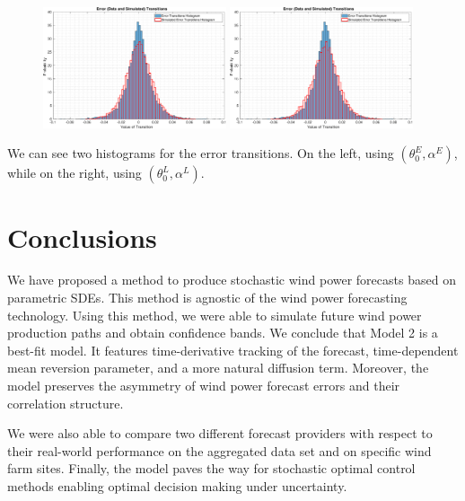 \documentclass[11pt]{article}
\theoremstyle{definition}
\begin{document}
\begin{figure}[ht!]
\centering
\includegraphics[width=0.48\textwidth]{../../MATLAB_Files/Results/histograms/classic/Optimal.eps}
\includegraphics[width=0.48\textwidth]{../../MATLAB_Files/Results/histograms/classic/Lamperti_Optimal.eps}
\end{figure}

We can see two histograms for the error transitions. On the left, using $(\theta_0^E,\alpha^E)$, while on the right, using $(\theta_0^L,\alpha^L)$.


\section{Conclusions} \label{Section_8}

We have proposed a method to produce stochastic wind power forecasts based on parametric SDEs. This method is agnostic of the wind power forecasting technology. Using this method, we were able to simulate future wind power production paths and obtain confidence bands. We conclude that Model 2 is a best-fit model. It features time-derivative tracking of the forecast, time-dependent mean reversion parameter, and a more natural diffusion term. Moreover, the model preserves the asymmetry of wind power forecast errors and their correlation structure.

We were also able to compare two different forecast providers with respect to their real-world performance on the aggregated data set and on specific wind farm sites. Finally, the model paves the way for stochastic optimal control methods enabling optimal decision making under uncertainty.
\end{document}

